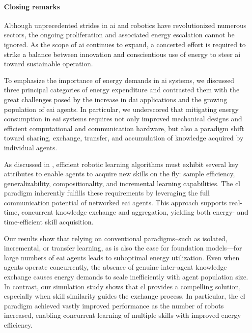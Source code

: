 \documentclass[12pt]{article}
\begin{document}
\paragraph*{Closing remarks}
Although unprecedented strides in \ac{ai} and robotics have revolutionized numerous sectors, the ongoing proliferation and associated energy escalation cannot be ignored. As the scope of \ac{ai} continues to expand, a concerted effort is required to strike a balance between innovation and conscientious use of energy to steer \ac{ai} toward sustainable operation.

To emphasize the importance of energy demands in \ac{ai} systems, we discussed three principal categories of energy expenditure and contrasted them with the great challenges posed by the increase in \acl{dai} applications and the growing population of \ac{eai} agents. In particular, we underscored that mitigating energy consumption in \ac{eai} systems requires not only improved mechanical designs and efficient computational and communication hardware, but also a paradigm shift toward sharing, exchange, transfer, and accumulation of knowledge acquired by individual agents.

As discussed in \cite{Kaelbling2020foundationefficientrobot}, efficient robotic learning algorithms must exhibit several key attributes to enable agents to acquire new skills on the fly: sample efficiency, generalizability, compositionality, and incremental learning capabilities. The \acl{cl} paradigm inherently fulfills these requirements by leveraging the full communication potential of networked \ac{eai} agents. This approach supports real-time, concurrent knowledge exchange and aggregation, yielding both energy- and time-efficient skill acquisition.

Our results show that relying on conventional paradigms--such as isolated, incremental, or transfer learning, as is also the case for foundation models---for large numbers of \ac{eai} agents leads to suboptimal energy utilization. Even when agents operate concurrently, the absence of genuine inter-agent knowledge exchange causes energy demands to scale inefficiently with agent population size. In contrast, our simulation study shows that \ac{cl} provides a compelling solution, especially when skill similarity guides the exchange process. In particular, the \ac{cl} paradigm achieved vastly improved performance as the number of robots increased, enabling concurrent learning of multiple skills with improved energy efficiency.
\end{document}

